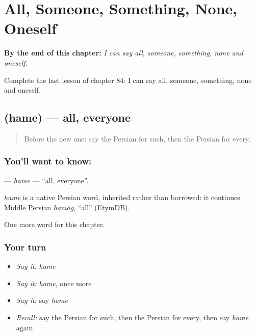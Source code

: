 
\chapter{All, Someone, Something, None, Oneself}
\label{ch:fa-all-someone-something-none-oneself}

\begin{chapteropening}
\textbf{By the end of this chapter:} \emph{I can say all, someone, something, none and oneself.}

Complete the last lesson of chapter 84: I can say all, someone, something, none and oneself.
\end{chapteropening}

\section[\texorpdfstring{\fa{همه} (hame)}{همه (hame)}]{ (hame) — all, everyone}

\label{lesson:FA-C84-hame}



\begin{quote}
Before the new one: say the Persian for such, then the Persian for every.
\end{quote}

\subsection*{You'll want to know: }
\textbf{} — \emph{hame} — \textquotedblleft{}all, everyone\textquotedblright{}.

\begin{cousinweb}
\emph{hame} is a native Persian word, inherited rather than borrowed: it continues Middle Persian \emph{hamāg}, \textquotedblleft{}all\textquotedblright{} (EtymDB).
\end{cousinweb}

\begin{grammarlens}[title={What you've built}]
One more word for this chapter.
\end{grammarlens}

\subsection*{Your turn}
\begin{itemize}
\raggedright
  \item \emph{Say it:} \emph{hame}
  \item \emph{Say it:} \emph{hame}, once more
  \item \emph{Say it:} say \emph{hame}
  \item \emph{Recall:} say the Persian for such, then the Persian for every, then say \emph{hame} again
\end{itemize}

